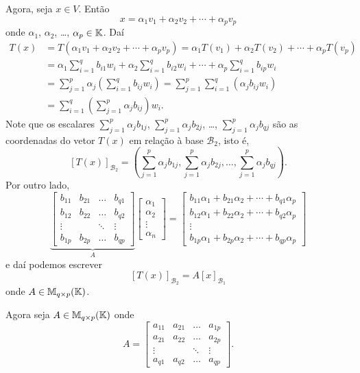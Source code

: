 Agora, seja $x \in V$. Então
\[
	x = \alpha_1v_1 + \alpha_2v_2 + \cdots + \alpha_pv_p
\]
onde $\alpha_1$, $\alpha_2$, \dots, $\alpha_p \in \mathbb{K}$. Daí
\begin{align*}
	T(x) &= T(\alpha_1v_1 + \alpha_2v_2 + \cdots + \alpha_pv_p) = \alpha_1T(v_1) + \alpha_2T(v_2) + \cdots + \alpha_pT(v_p)\\
	&= \alpha_1\sum_{i=1}^qb_{i1}w_i + \alpha_2\sum_{i=1}^qb_{i2}w_i + \cdots + \alpha_p\sum_{i=1}^qb_{ip}w_i\\
	&= \sum_{j=1}^p\alpha_j\left(\sum_{i=1}^qb_{ij}w_i\right) = \sum_{j=1}^p\sum_{i=1}^q(\alpha_jb_{ij}w_i)\\
	&= \sum_{i=1}^q\left(\sum_{j=1}^p\alpha_jb_{ij}\right)w_i.
\end{align*}
Note que os escalares $\sum_{j=1}^p\alpha_jb_{1j}$, $\sum_{j=1}^p\alpha_jb_{2j}$, \dots, $\sum_{j=1}^p\alpha_jb_{qj}$ são as coordenadas do vetor $T(x)$ em relação à base $\mathcal{B}_2$, isto é,
\[
	[T(x)]_{\mathcal{B}_2} = \left(\sum_{j=1}^p\alpha_jb_{1j}, \sum_{j=1}^p\alpha_jb_{2j}, \dots, \sum_{j=1}^p\alpha_jb_{qj}\right).
\]
Por outro lado,
\[
	\underbrace{\begin{bmatrix}
		b_{11} & b_{21} & \dots & b_{q1}\\
		b_{12} & b_{22} & \dots & b_{q2}\\
		\vdots & & \ddots & \vdots\\
		b_{1p} & b_{2p} & \dots & b_{qp}
	\end{bmatrix}}_{A}\begin{bmatrix}
		\alpha_1\\
		\alpha_2\\
		\vdots\\
		\alpha_n
	\end{bmatrix} = \begin{bmatrix}
		b_{11}\alpha_1 + b_{21}\alpha_2 + \cdots + b_{q1}\alpha_p\\
		b_{12}\alpha_1 + b_{22}\alpha_2 + \cdots + b_{q2}\alpha_p\\
		\vdots \\
		b_{1p}\alpha_1 + b_{2p}\alpha_2 + \cdots + b_{qp}\alpha_p
	\end{bmatrix}
\]
e daí podemos escrever
\[
	[T(x)]_{\mathcal{B}_2} = A[x]_{\mathcal{B}_1}
\]
onde $A \in \mathbb{M}_{q\times p}(\mathbb{K})$.

Agora seja $A \in \mathbb{M}_{q\times p}(\mathbb{K})$ onde
\[
	A = \begin{bmatrix}
		a_{11} & a_{21} & \dots & a_{1p}\\
		a_{21} & a_{22} & \dots & a_{2p}\\
		\vdots & & \ddots & \vdots\\
		a_{q1} & a_{q2} & \dots & a_{qp}
	\end{bmatrix}.
\]

